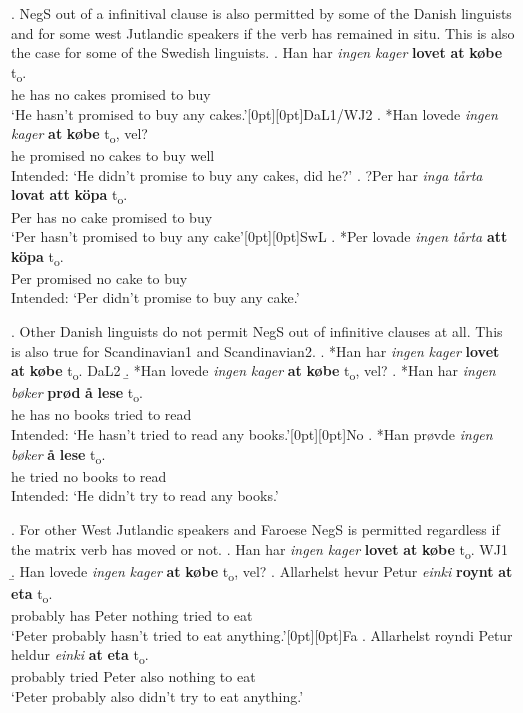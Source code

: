 \documentclass[12pt, letterpaper]{article}
\newcommand{\rcommentg}[1]{\hfill\raisebox{1.9\baselineskip}[0pt][0pt]{#1}} %
\begin{document}
\ex. NegS out of a infinitival clause is also permitted by some of the Danish linguists and for some west Jutlandic speakers if the verb has remained in situ. This is also the case for some of the Swedish linguists.
\ag. Han har \textit{ingen} \textit{kager} \textbf{lovet} \textbf{at} \textbf{købe} t\textsubscript{o}.\\
he has no cakes promised to buy\\
`He hasn't promised to buy any cakes.'\rcommentg{DaL1/WJ2}
\bg. *Han lovede \textit{ingen} \textit{kager} \textbf{at} \textbf{købe} t\textsubscript{o}, vel?\\
he promised no cakes to buy {} well\\
Intended: `He didn't promise to buy any cakes, did he?'
\cg. ?Per har \textit{inga} \textit{tårta} \textbf{lovat} \textbf{att} \textbf{köpa} t\textsubscript{o}.\\
 Per has no cake promised to buy\\
 `Per hasn't promised to buy any cake'\rcommentg{SwL}
\dg. *Per lovade \textit{ingen} \textit{tårta} \textbf{att} \textbf{köpa} t\textsubscript{o}.\\
Per promised no cake to buy\\
Intended: `Per didn't promise to buy any cake.'

\ex. Other Danish linguists do not permit NegS out of infinitive clauses at all. This is also true for Scandinavian1 and Scandinavian2.
\a. *Han har \textit{ingen} \textit{kager} \textbf{lovet} \textbf{at} \textbf{købe} t\textsubscript{o}. \hfill DaL2
\b. *Han lovede \textit{ingen} \textit{kager} \textbf{at} \textbf{købe} t\textsubscript{o}, vel?
\cg. *Han har \textit{ingen} \textit{bøker} \textbf{prød} \textbf{å} \textbf{lese} t\textsubscript{o}.\\
he has no books tried to read\\
Intended: `He hasn't tried to read any books.'\rcommentg{No}  
\dg. *Han prøvde \textit{ingen} \textit{bøker} \textbf{å} \textbf{lese} t\textsubscript{o}.\\
he tried no books to read\\
Intended: `He didn't try to read any books.'
 
\ex. For other West Jutlandic speakers and Faroese NegS is permitted regardless if the matrix verb has moved or not.
\a. Han har \textit{ingen} \textit{kager} \textbf{lovet} \textbf{at} \textbf{købe} t\textsubscript{o}. \hfill WJ1
\b. Han lovede \textit{ingen} \textit{kager} \textbf{at} \textbf{købe} t\textsubscript{o}, vel?
\cg. Allarhelst hevur Petur \textit{einki} \textbf{roynt} \textbf{at} \textbf{eta} t\textsubscript{o}. \\
probably has Peter nothing tried to eat\\
`Peter probably hasn't tried to eat anything.'\rcommentg{Fa}
\dg. Allarhelst royndi Petur heldur \textit{einki} \textbf{at} \textbf{eta} t\textsubscript{o}.\\
probably tried Peter also nothing to eat\\
`Peter probably also didn't try to eat anything.'
\end{document}
